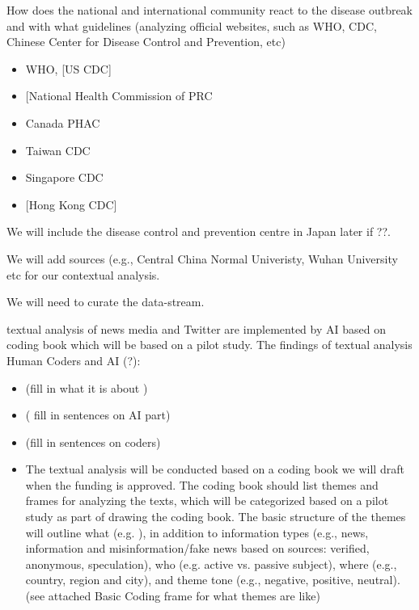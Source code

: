 How does the national and international community react to the disease outbreak and with what guidelines (analyzing official websites, such as WHO, CDC, Chinese Center for Disease Control and Prevention, etc)

\begin{itemize}
\item{WHO, [US CDC]
}
\item{[National Health Commission of PRC
}
\item{Canada PHAC
}
\item{Taiwan CDC
}
\item{Singapore CDC
}
\item{[Hong Kong CDC]}
\end{itemize}
We will include the disease control and prevention centre in Japan later if ??.

We will add sources (e.g., Central China Normal Univeristy, Wuhan University
etc for our contextual analysis.


We will need to curate the data-stream.


textual analysis of news media and Twitter are implemented by AI based on coding book which will be based on a pilot study. 
The findings of textual analysis Human Coders and AI (?):
\begin{itemize}
\item{(fill in what it is about )}
\item{( fill in sentences on AI part)}
\item{(fill in sentences on coders)}
\item{The textual analysis will be conducted based on a coding book we will draft when the funding is approved. The coding book should list themes and frames for analyzing the texts, which will be categorized based on a pilot study as part of drawing the coding book. The basic structure of the themes will outline what (e.g. ), in addition to information types (e.g., news, information and misinformation/fake news based on sources: verified, anonymous, speculation), who (e.g. active vs. passive subject), where (e.g., country, region and city), and theme tone (e.g., negative, positive, neutral). (see attached Basic Coding frame for what themes are like)
}
\end{itemize}

